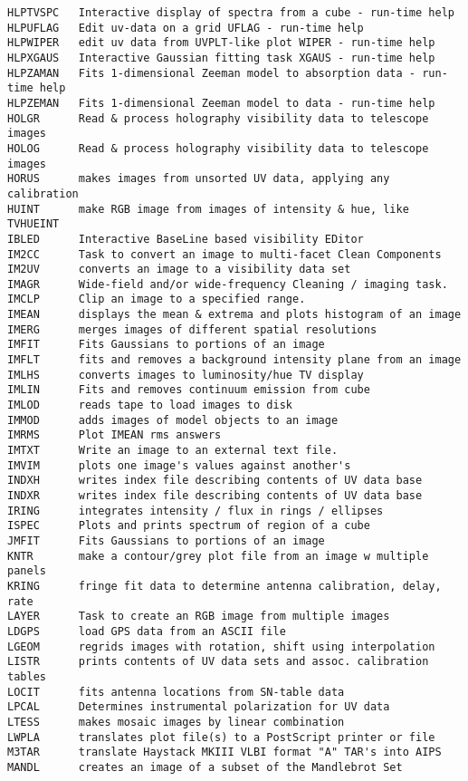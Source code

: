 \begin{verbatim}
HLPTVSPC   Interactive display of spectra from a cube - run-time help
HLPUFLAG   Edit uv-data on a grid UFLAG - run-time help
HLPWIPER   edit uv data from UVPLT-like plot WIPER - run-time help
HLPXGAUS   Interactive Gaussian fitting task XGAUS - run-time help
HLPZAMAN   Fits 1-dimensional Zeeman model to absorption data - run-time help
HLPZEMAN   Fits 1-dimensional Zeeman model to data - run-time help
HOLGR      Read & process holography visibility data to telescope images
HOLOG      Read & process holography visibility data to telescope images
HORUS      makes images from unsorted UV data, applying any calibration
HUINT      make RGB image from images of intensity & hue, like TVHUEINT
IBLED      Interactive BaseLine based visibility EDitor
IM2CC      Task to convert an image to multi-facet Clean Components
IM2UV      converts an image to a visibility data set
IMAGR      Wide-field and/or wide-frequency Cleaning / imaging task.
IMCLP      Clip an image to a specified range.
IMEAN      displays the mean & extrema and plots histogram of an image
IMERG      merges images of different spatial resolutions
IMFIT      Fits Gaussians to portions of an image
IMFLT      fits and removes a background intensity plane from an image
IMLHS      converts images to luminosity/hue TV display
IMLIN      Fits and removes continuum emission from cube
IMLOD      reads tape to load images to disk
IMMOD      adds images of model objects to an image
IMRMS      Plot IMEAN rms answers
IMTXT      Write an image to an external text file.
IMVIM      plots one image's values against another's
INDXH      writes index file describing contents of UV data base
INDXR      writes index file describing contents of UV data base
IRING      integrates intensity / flux in rings / ellipses
ISPEC      Plots and prints spectrum of region of a cube
JMFIT      Fits Gaussians to portions of an image
KNTR       make a contour/grey plot file from an image w multiple panels
KRING      fringe fit data to determine antenna calibration, delay, rate
LAYER      Task to create an RGB image from multiple images
LDGPS      load GPS data from an ASCII file
LGEOM      regrids images with rotation, shift using interpolation
LISTR      prints contents of UV data sets and assoc. calibration tables
LOCIT      fits antenna locations from SN-table data
LPCAL      Determines instrumental polarization for UV data
LTESS      makes mosaic images by linear combination
LWPLA      translates plot file(s) to a PostScript printer or file
M3TAR      translate Haystack MKIII VLBI format "A" TAR's into AIPS
MANDL      creates an image of a subset of the Mandlebrot Set

\end{verbatim}
